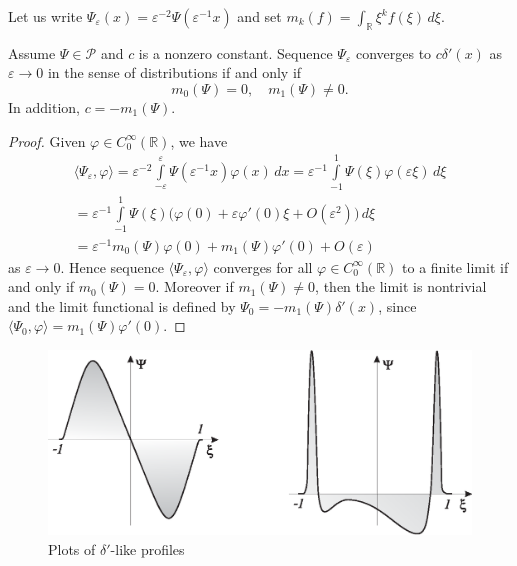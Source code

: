 \documentclass[11pt,english]{amsart}%
\begin{document}
Let us write $\Psi_\varepsilon(x)=\varepsilon^{-2}\Psi(\varepsilon^{-1}x)$ and set $m_k(f)=\int_{\mathbb{R}}\xi^k f(\xi)\,d\xi$.
\begin{g_lemma}\label{LemDelFunc}
Assume $\Psi\in \mathcal{P}$ and  $c$ is a nonzero constant. Sequence $\Psi_\varepsilon$ converges to $c\delta'(x)$ as $\varepsilon\to 0$ in the sense of distributions  if and only if
\begin{equation}\label{CondDeltPrime}
    m_0(\Psi)=0, \quad m_1(\Psi)\neq 0.
\end{equation}
In addition, $c=-m_1(\Psi)$.
\end{g_lemma}
\begin{proof}
Given $\varphi\in C_0^\infty(\mathbb{R})$, we have
\begin{multline*}
\langle\Psi_\varepsilon,\varphi\rangle=
\varepsilon^{-2}\int\limits_{-\varepsilon}^{\varepsilon}
\Psi(\varepsilon^{-1}x)\varphi(x)\,dx=
\varepsilon^{-1}\int\limits_{-1}^1 \Psi(\xi)\varphi(\varepsilon\xi)\,d\xi\\
=\varepsilon^{-1}\int\limits_{-1}^1
\Psi(\xi)\bigl(\varphi(0)+\varepsilon\varphi'(0)\xi+O(\varepsilon^2)\bigr)\,d\xi\\=
\varepsilon^{-1}m_0(\Psi)\varphi(0)+m_1(\Psi)\varphi'(0)+O(\varepsilon)
\end{multline*}
as $\varepsilon \to 0$. Hence sequence $\langle\Psi_\varepsilon,\varphi\rangle$ converges for all $\varphi\in C_0^\infty(\mathbb{R})$ to a finite limit  if and only if $m_0(\Psi)=0$.
Moreover if $m_1(\Psi)\neq 0$, then the limit is nontrivial and the limit functional is defined by  $\Psi_0=-m_1(\Psi)\delta'(x)$, since $\langle\Psi_0,\varphi\rangle=m_1(\Psi)\varphi'(0)$.
\end{proof}

\begin{figure}[h]
\centering
  \includegraphics[scale=.6]{Potentials}
  \caption{Plots of $\delta'$-like profiles}\label{FigPotential}
\end{figure}
\end{document}
